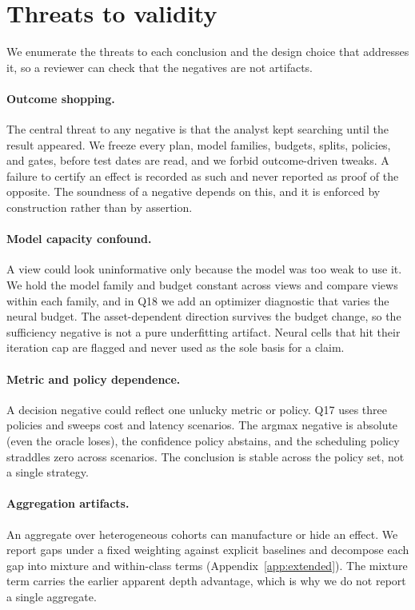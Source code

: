 \section{Threats to validity}
\label{app:threats}

We enumerate the threats to each conclusion and the design choice that addresses it, so a
reviewer can check that the negatives are not artifacts.

\paragraph{Outcome shopping.} The central threat to any negative is that the analyst kept
searching until the result appeared. We freeze every plan, model families, budgets, splits,
policies, and gates, before test dates are read, and we forbid outcome-driven tweaks. A
failure to certify an effect is recorded as such and never reported as proof of the opposite.
The soundness of a negative depends on this, and it is enforced by construction rather than by
assertion.

\paragraph{Model capacity confound.} A view could look uninformative only because the model was
too weak to use it. We hold the model family and budget constant across views and compare views
within each family, and in Q18 we add an optimizer diagnostic that varies the neural budget. The
asset-dependent direction survives the budget change, so the sufficiency negative is not a pure
underfitting artifact. Neural cells that hit their iteration cap are flagged and never used as
the sole basis for a claim.

\paragraph{Metric and policy dependence.} A decision negative could reflect one unlucky metric
or policy. Q17 uses three policies and sweeps cost and latency scenarios. The argmax negative is
absolute (even the oracle loses), the confidence policy abstains, and the scheduling policy
straddles zero across scenarios. The conclusion is stable across the policy set, not a single
strategy.

\paragraph{Aggregation artifacts.} An aggregate over heterogeneous cohorts can manufacture or
hide an effect. We report gaps under a fixed weighting against explicit baselines and decompose
each gap into mixture and within-class terms (Appendix~\ref{app:extended}). The mixture term
carries the earlier apparent depth advantage, which is why we do not report a single aggregate.

